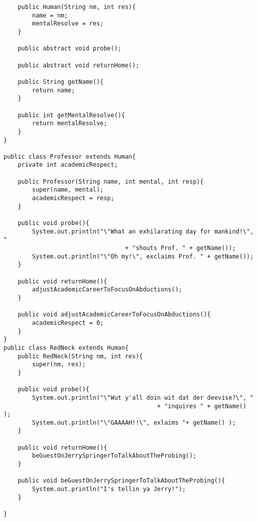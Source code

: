 \documentclass[11pt]{article}
\newenvironment{answer}{\large\lstset{basicstyle=\large}\color{white}}{}
\newenvironment{answer}{\large\lstset{basicstyle=\large}\color{red}}{}
\begin{document}
\begin{enumerate}
\begin{answer}
\begin{lstlisting}
    public Human(String nm, int res){
        name = nm;
        mentalResolve = res;
    }

    public abstract void probe();

    public abstract void returnHome();

    public String getName(){
        return name;
    }

    public int getMentalResolve(){
        return mentalResolve;
    }
}

public class Professor extends Human{
    private int academicRespect;

    public Professor(String name, int mental, int resp){
        super(name, mental);
        academicRespect = resp;
    }

    public void probe(){
        System.out.println("\"What an exhilarating day for mankind!\", "
                                  + "shouts Prof. " + getName());
        System.out.println("\"Oh my!\", exclaims Prof. " + getName());
    }

    public void returnHome(){
        adjustAcademicCareerToFocusOnAbductions();
    }

    public void adjustAcademicCareerToFocusOnAbductions(){
        academicRespect = 0;
    }
}
public class RedNeck extends Human{
    public RedNeck(String nm, int res){
        super(nm, res);
    }

    public void probe(){
        System.out.println("\"Wut y'all doin wit dat der deevise?\", "
                                           + "inquires " + getName() );
        System.out.println("\"GAAAAH!!\", exlaims "+ getName() );
    }

    public void returnHome(){
        beGuestOnJerrySpringerToTalkAboutTheProbing();
    }

    public void beGuestOnJerrySpringerToTalkAboutTheProbing(){
        System.out.println("I's tellin ya Jerry!");
    }

}

\end{lstlisting}
\end{answer}

\end{enumerate}
\end{document}
